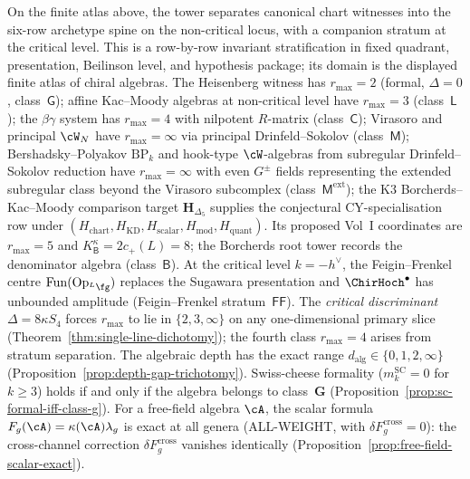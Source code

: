 On the finite atlas above, the tower separates canonical chart
witnesses into the six-row archetype spine on the non-critical locus,
with a companion stratum at the critical level. This is a
row-by-row invariant stratification in fixed quadrant, presentation,
Beilinson level, and hypothesis package; its domain is the displayed
finite atlas of chiral algebras.
The Heisenberg witness has $r_{\max} = 2$ (formal,
$\Delta = 0$, class~$\mathsf G$); affine Kac--Moody algebras at non-critical
level have $r_{\max} = 3$ (class~$\mathsf L$); the $\beta\gamma$ system has
$r_{\max} = 4$ with nilpotent $R$-matrix (class~$\mathsf C$); Virasoro
and principal $\cW_N$ have $r_{\max} = \infty$ via principal
Drinfeld--Sokolov (class~$\mathsf M$); Bershadsky--Polyakov $\mathrm{BP}_k$
and hook-type $\cW$-algebras from subregular Drinfeld--Sokolov reduction
have $r_{\max} = \infty$ with even $G^\pm$ fields representing
the extended subregular class beyond the Virasoro subcomplex
(class~$\mathsf M^{\mathrm{ext}}$);
the K3 Borcherds--Kac--Moody comparison target
$\mathbf H_{\Delta_5}$ supplies the conjectural CY-specialisation row
under $(H_{\mathrm{chart}},H_{\mathrm{KD}},H_{\mathrm{scalar}},
H_{\mathrm{mod}},H_{\mathrm{quant}})$.  Its proposed Vol~I coordinates
are $r_{\max}=5$ and $K^\kappa_{\mathsf B}=2c_+(L)=8$; the Borcherds
root tower records the denominator algebra
(class~$\mathsf B$). At the critical level $k=-h^\vee$, the
Feigin--Frenkel centre
$\operatorname{Fun}(\operatorname{Op}_{{}^L\fg})$ replaces the
Sugawara presentation and $\ChirHoch^\bullet$ has unbounded amplitude
(Feigin--Frenkel stratum~$\mathsf{FF}$). The
\emph{critical discriminant} $\Delta = 8\kappa S_4$ forces
$r_{\max}$ to lie in $\{2, 3, \infty\}$ on any one-dimensional
primary slice (Theorem~\ref{thm:single-line-dichotomy}); the
fourth class $r_{\max} = 4$ arises from stratum
separation.
The algebraic depth has the exact range
$d_{\mathrm{alg}} \in \{0, 1, 2, \infty\}$
(Proposition~\ref{prop:depth-gap-trichotomy}).
Swiss-cheese formality ($m_k^{\mathrm{SC}} = 0$ for
$k \geq 3$) holds if and only if the algebra belongs to
class~$\mathbf{G}$
(Proposition~\ref{prop:sc-formal-iff-class-g}).
For a free-field algebra $\cA$, the scalar formula
$F_g(\cA)=\kappa(\cA)\lambda_g$ is exact at all genera
\textup{(ALL-WEIGHT, with $\delta F_g^{\mathrm{cross}} = 0$)}: the cross-channel correction
$\delta F_g^{\mathrm{cross}}$ vanishes identically
(Proposition~\ref{prop:free-field-scalar-exact}).

